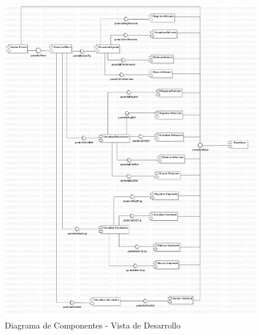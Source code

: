 \begin{figure}[!h]
	\centering
	\includegraphics[width=1\textwidth]{./diseno/vdesarrollo/imagenes/vistaDesarrollo}
	\caption{Diagrama de Componentes - Vista de Desarrollo}
	\label{fig:Diagrama de Componentes - Vista de Desarrollo}
	\end{figure}
\clearpage
